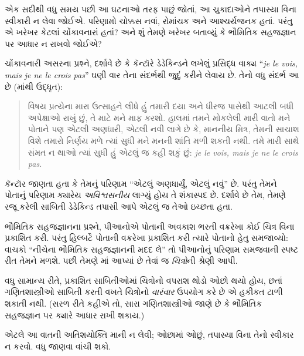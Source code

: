 \documentclass[../../../include/open-logic-section]{subfiles}
\begin{document}


એક સદીથી વધુ સમય પછી આ ઘટનાઓ તરફ
પાછું જોતાં, આ ચુકાદાઓને તપાસ્યા વિના
સ્વીકારી ન લેવા જોઈએ. પરિણામો ચોક્કસ
નવાં, રોમાંચક અને આશ્ચર્યજનક હતાં.
પરંતુ એ ખરેખર કેટલાં ચોંકાવનારાં હતાં?
અને શું તેમણે ખરેખર બતાવ્યું કે
ભૌમિતિક સહજજ્ઞાન પર આધાર ન રાખવો જોઈએ?

ચોંકાવનારી અસરના પ્રશ્ને,
\citet{Gouvea2011} દર્શાવે છે કે
કૅન્ટૉરે ડેડેકિન્ડને લખેલું પ્રસિદ્ધ
વાક્ય “\emph{je le vois, mais je ne le crois pas}”
ઘણી વાર તેના સંદર્ભથી જુદું કરીને લેવાય છે.
તેનો વધુ સંદર્ભ આ છે
(\citeauthor{Gouvea2011}માંથી ઉદ્ધૃત):
\begin{quote}
વિષય પ્રત્યેના મારા ઉત્સાહને લીધે
હું તમારી દયા અને ધીરજ પાસેથી
આટલી બધી અપેક્ષાઓ રાખું છું,
તે માટે મને માફ કરશો. હાલમાં
તમને મોકલેલી મારી વાતો મને
પોતાને પણ એટલી અણધારી,
એટલી નવી લાગે છે કે, માનનીય
મિત્ર, તેમની સાચાશ વિશે તમારો
નિર્ણય મળે ત્યાં સુધી મને
મનની શાંતિ મળી શકતી નથી.
તમે મારી સાથે સંમત ન થાઓ
ત્યાં સુધી હું એટલું જ કહી
શકું છું: \emph{je le vois, mais je ne le crois pas.}
\end{quote}
કૅન્ટૉર જાણતા હતા કે તેમનું
પરિણામ “એટલું અણધાર્યું,
એટલું નવું” છે. પરંતુ તેમને
પોતાનું પરિણામ ક્યારેય
\emph{અવિશ્વસનીય} લાગ્યું હોય
તે શંકાસ્પદ છે. \citeauthor{Gouvea2011}
દર્શાવે છે તેમ, તેમણે રજૂ કરેલી
સાબિતી ડેડેકિન્ડ તપાસી આપે
એટલું જ તેઓ ઇચ્છતા હતા.

ભૌમિતિક સહજજ્ઞાનના પ્રશ્ને,
પીઆનોએ પોતાની અવકાશ ભરતી
વક્રરેખા કોઈ ચિત્ર વિના
પ્રકાશિત કરી. પરંતુ હિલ્બર્ટે
પોતાની વક્રરેખા પ્રકાશિત
કરી ત્યારે પોતાનો હેતુ સમજાવ્યો:
વાચકો “નીચેના ભૌમિતિક
સહજજ્ઞાનની મદદ લે” તો
પીઆનોનું પરિણામ સમજવાની
સ્પષ્ટ રીત તેમને મળશે.
પછી તેમણે
માં
આપ્યાં છે તેવાં જ
\emph{ચિત્રો}ની શ્રેણી આપી.

વધુ સામાન્ય રીતે, પ્રકાશિત
સાબિતીઓમાં ચિત્રોનો વપરાશ
થોડો ઓછો થયો હોય, છતાં
ગણિતશાસ્ત્રીઓ સાબિતી કરતી
વખતે ચિત્રોનો \emph{વારંવાર}
ઉપયોગ કરે છે એ હકીકત
ટાળી શકાતી નથી. (સરળ
રીતે કહીએ તો, સારા
ગણિતશાસ્ત્રીઓ જાણે છે કે
ભૌમિતિક સહજજ્ઞાન પર
ક્યારે આધાર રાખી શકાય.)

એટલે આ વાતની અતિશયોક્તિ
માની ન લેવી; ઓછામાં ઓછું,
તપાસ્યા વિના તેનો સ્વીકાર
ન કરવો. વધુ જાણવા
\citet{Giaquinto2007} વાંચી શકો.
\end{document}
